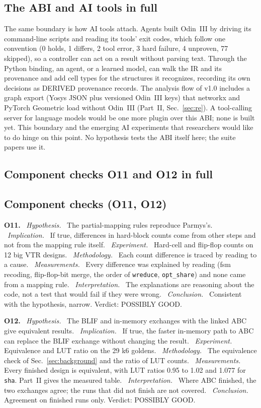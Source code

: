 \documentclass[conference]{IEEEtran}
\newcommand{\code}[1]{\texttt{#1}}
\newcommand{\argid}[1]{\par\smallskip\noindent\textbf{#1.}}
\newcommand{\ah}[1]{\ \textit{#1.}\ }
\begin{document}
\subsection{The ABI and AI tools in full}

The same boundary is how AI tools attach. Agents built Odin~III by driving its command-line scripts and reading its tools' exit codes, which follow one convention (0 holds, 1 differs, 2 tool error, 3 hard failure, 4 unproven, 77 skipped), so a controller can act on a result without parsing text. Through the Python binding, an agent, or a learned model, can walk the IR and its provenance and add cell types for the structures it recognizes, recording its own decisions as DERIVED provenance records. The analysis flow of v1.0 includes a graph export (Yosys JSON plus versioned Odin~III keys) that networkx and PyTorch Geometric load without Odin~III (Part~II, Sec.~\ref{sec:re}). A tool-calling server for language models would be one more plugin over this ABI; none is built yet. This boundary and the emerging AI experiments that researchers would like to do hinge on this point. No hypothesis tests the ABI itself here; the suite papers use it.

\subsection{Component checks O11 and O12 in full}

\subsection{Component checks (O11, O12)}

\argid{O11}
\ah{Hypothesis} The partial-mapping rules reproduce Parmys's.
\ah{Implication} If true, differences in hard-block counts come from other steps and not from the mapping rule itself.
\ah{Experiment} Hard-cell and flip-flop counts on 12 big VTR designs.
\ah{Methodology} Each count difference is traced by reading to a cause.
\ah{Measurements} Every difference was explained by reading (fsm recoding, flip-flop-bit merge, the order of \code{wreduce}, \code{opt\_share}) and none came from a mapping rule.
\ah{Interpretation} The explanations are reasoning about the code, not a test that would fail if they were wrong.
\ah{Conclusion} Consistent with the hypothesis, narrow. Verdict: POSSIBLY GOOD.

\argid{O12}
\ah{Hypothesis} The BLIF and in-memory exchanges with the linked ABC give equivalent results.
\ah{Implication} If true, the faster in-memory path to ABC can replace the BLIF exchange without changing the result.
\ah{Experiment} Equivalence and LUT ratio on the 29 k6 goldens.
\ah{Methodology} The equivalence check of Sec.~\ref{sec:background} and the ratio of LUT counts.
\ah{Measurements} Every finished design is equivalent, with LUT ratios 0.95 to 1.02 and 1.077 for \code{sha}. Part~II gives the measured table.
\ah{Interpretation} Where ABC finished, the two exchanges agree; the runs that did not finish are not covered.
\ah{Conclusion} Agreement on finished runs only. Verdict: POSSIBLY GOOD.
\end{document}
